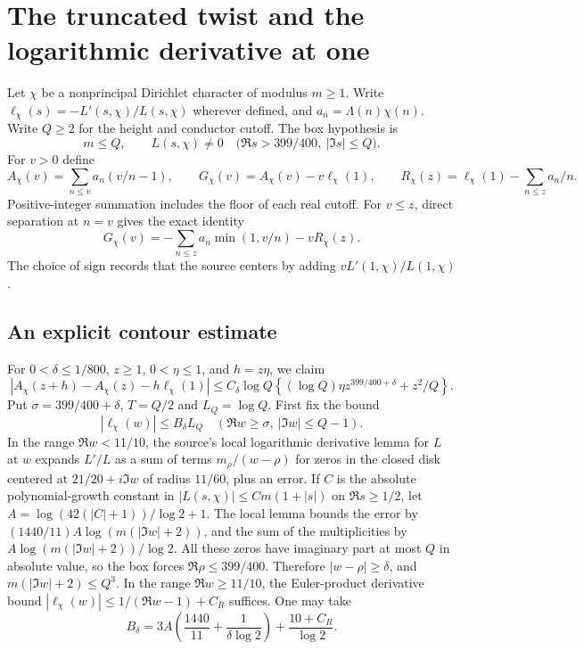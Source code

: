 \section{The truncated twist and the logarithmic derivative at one}
\label{sec:window-explicit}

Let \(\chi\) be a nonprincipal Dirichlet character of modulus \(m\ge1\).
Write \(\ell_\chi(s)=-L'(s,\chi)/L(s,\chi)\) wherever defined,
and \(a_n=\Lambda(n)\chi(n)\). Write \(Q\ge2\) for the height
and conductor cutoff. The box hypothesis is
\[
 m\le Q,\qquad L(s,\chi)\ne0
 \quad\bigl(\Re s>399/400,\ |\Im s|\le Q\bigr).
\]
For \(v>0\) define
\[
 A_\chi(v)=\sum_{n\le v}a_n(v/n-1),\qquad
 G_\chi(v)=A_\chi(v)-v\ell_\chi(1),\qquad
 R_\chi(z)=\ell_\chi(1)-\sum_{n\le z}a_n/n .
\]
Positive-integer summation includes the floor of each real cutoff.
For \(v\le z\), direct separation at \(n=v\) gives the exact identity
\begin{equation}
 G_\chi(v)=-\sum_{n\le z}a_n\min(1,v/n)-vR_\chi(z).
 \label{eq:box-finite-split}
\end{equation}
The choice of sign records that the source centers by adding
\(vL'(1,\chi)/L(1,\chi)\).

\subsection{An explicit contour estimate}

For \(0<\delta\le1/800\), \(z\ge1\), \(0<\eta\le1\), and
\(h=z\eta\), we claim
\begin{equation}
 |A_\chi(z+h)-A_\chi(z)-h\ell_\chi(1)|
 \le C_\delta\log Q
   \left\{(\log Q)\eta z^{399/400+\delta}+z^2/Q\right\}.
 \label{eq:box-contour}
\end{equation}
Put \(\sigma=399/400+\delta\), \(T=Q/2\) and \(L_Q=\log Q\).
First fix the bound
\[
 |\ell_\chi(w)|\le B_\delta L_Q\quad
          (\Re w\ge \sigma,\ |\Im w|\le Q-1).
\]
In the range \(\Re w<11/10\), the source's local logarithmic
derivative lemma for \(L\) at \(w\) expands \(L'/L\) as a sum of
terms \(m_\rho/(w-\rho)\) for zeros in the closed disk centered at
\(21/20+i\Im w\) of radius \(11/60\), plus an error.
If \(C\) is the absolute polynomial-growth constant in
\(|L(s,\chi)|\le C m(1+|s|)\) on \(\Re s\ge1/2\), let
\(A=\log(42(|C|+1))/\log2+1\).
The local lemma bounds the error by
\((1440/11)A\log(m(|\Im w|+2))\), and the sum of the
multiplicities by \(A\log(m(|\Im w|+2))/\log2\).
All these zeros have imaginary part at most \(Q\) in absolute
value, so the box forces \(\Re\rho\le399/400\). Therefore
\(|w-\rho|\ge\delta\), and \(m(|\Im w|+2)\le Q^3\).
In the range \(\Re w\ge11/10\), the Euler-product derivative
bound \(|\ell_\chi(w)|\le 1/(\Re w-1)+C_R\) suffices. One may take
\[
 B_\delta=3A\left(\frac{1440}{11}
               +\frac{1}{\delta\log2}\right)
                  +\frac{10+C_R}{\log2}.
\]


